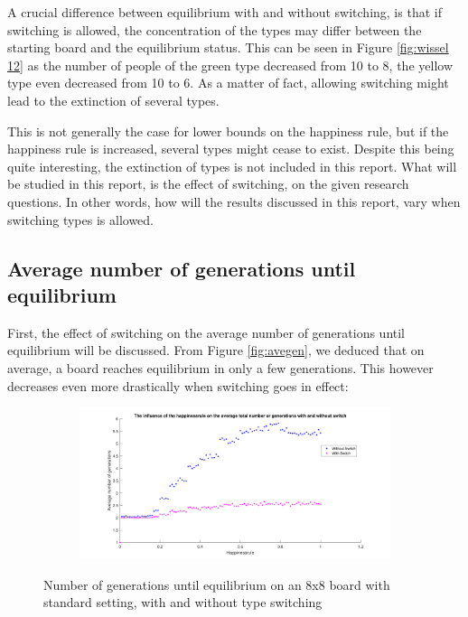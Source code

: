 A crucial difference between equilibrium with and without switching, is that if switching is allowed, the concentration of the types may differ between the starting board and the equilibrium status. 
This can be seen in Figure \ref{fig:wissel 12} as the number of people of the green type decreased from 10 to 8, the yellow type even decreased from 10 to 6. 
As a matter of fact, allowing switching might lead to the extinction of several types. 

This is not generally the case for lower bounds on the happiness rule, but if the happiness rule is increased, several types might cease to exist. Despite this being quite interesting, the extinction of types is not included in this report.
What will be studied in this report, is the effect of switching, on the given research questions. In other words, how will the results discussed in this report, vary when switching types is allowed. 
\newpage

\subsection{Average number of generations until equilibrium}\label{subsec:avegensw}
First, the effect of switching on the average number of generations until equilibrium will be discussed. 
From Figure \ref{fig:avegen}, we deduced that on average, a board reaches equilibrium in only a few generations. This however decreases even more drastically when switching goes in effect:

\begin{figure}[H]
	\centering
    \begin{subfigure}{0.9\textwidth}
        \includegraphics[width=\textwidth]{happinessrule-totaantgenwithswitchorwithoutswitch}
    \end{subfigure}
    \caption{Number of generations until equilibrium on an 8x8 board with standard setting, with and without type switching}
    \label{fig:AantGenS}
\end{figure}

